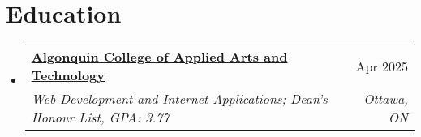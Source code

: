 \documentclass[letterpaper,11pt]{article}
\makeatletter
\newcommand{\resumeSubheading}[4]{
  \vspace{-1pt}\item
    \begin{tabular*}{0.97\textwidth}[t]{l@{\extracolsep{\fill}}r}
      \textbf{#1} & #2 \\
      \textit{\small#3} & \textit{\small #4} \\
    \end{tabular*}\vspace{-5pt}
}
\newcommand{\resumeSubHeadingListStart}{\begin{itemize}[leftmargin=*]}
\newcommand{\resumeSubHeadingListEnd}{\end{itemize}}
\makeatother
\begin{document}
\section{Education}
  \resumeSubHeadingListStart
    \resumeSubheading
      {\href{https://www.algonquincollege.com/sat/program/web-development-internet-applications/}{Algonquin College of Applied Arts and Technology}}{Apr 2025}
      {Web Development and Internet Applications; Dean's Honour List, GPA: 3.77}{Ottawa, ON}
  \resumeSubHeadingListEnd
\end{document}
